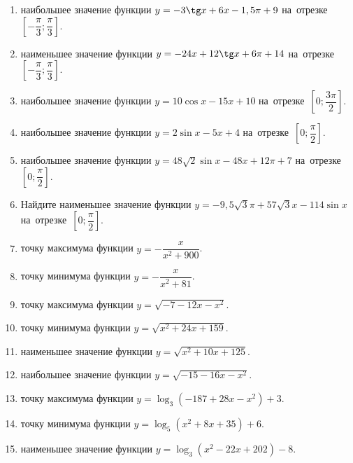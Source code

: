 \documentclass[a4paper,10pt]{article}
\begin{document}
\begin{enumerate}
\item {} наибольшее значение функции $y=-3\tg x +6x-1,5\pi +9$ на~отрезке~$\left[-\dfrac{\pi}{3};\dfrac{\pi}{3}\right]$.

\item {} наименьшее значение функции $y=-24x +12\tg x+6\pi+14$ на~отрезке~$\left[-\dfrac{\pi}{3};\dfrac{\pi}{3}\right]$.

\item {} наибольшее значение функции $y=10\cos x-15x+10$ на~отрезке~$\left[0;\dfrac{3\pi}{2}\right]$.

\item {} наибольшее значение функции $y=2\sin x-5x+4$ на~отрезке~$\left[0;\dfrac{\pi}{2}\right]$.

\item {} наибольшее значение функции $y=48\sqrt{2}\sin x-48x+12\pi +7$ на~отрезке~$\left[0;\dfrac{\pi}{2}\right]$.

\item Найдите наименьшее значение функции $y=-9,5\sqrt{3}\pi+57\sqrt{3}x-114\sin x$ на~отрезке~$\left[0;\dfrac{\pi}{2}\right]$.

\item {} точку максимума функции $y=-\dfrac{x}{ x^2 +900}$.

\item {} точку минимума функции $y=-\dfrac{x}{ x^2 +81}$.

\item {} точку максимума функции $y=\sqrt{-7-12x-x^2}$.

\item {} точку минимума функции $y=\sqrt{x^2+24x+159}$.

\item {} наименьшее значение функции $y=\sqrt{x^2+10x+125}$.

\item {} наибольшее значение функции $y=\sqrt{-15-16x-x^2}$.

\item {} точку максимума функции $y=\log_3\left(-187+28x-x^2\right)+3$.

\item {} точку минимума функции $y=\log_5\left(x^2+8x+35\right)+6$.

\item {} наименьшее значение функции $y=\log_3\left(x^2-22x+202\right)-8$.


\end{enumerate}
\end{document}
